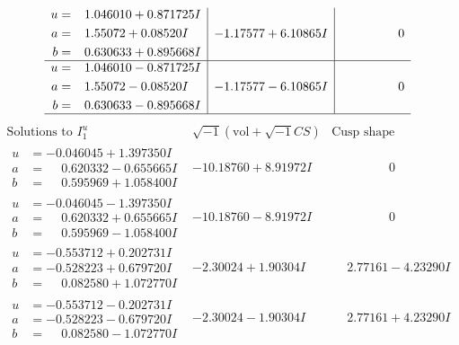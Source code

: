 \documentclass[1p]{elsarticle_modified}
\theoremstyle{definition}
\newcommand{\I}{\sqrt{-1}}
\begin{document}
$$\begin{array}{c|c|c}
\begin{aligned}
u &= \phantom{-}1.046010 + 0.871725 I \\
a &= \phantom{-}1.55072 + 0.08520 I \\
b &= \phantom{-}0.630633 + 0.895668 I\end{aligned}
 & -1.17577 + 6.10865 I & \phantom{-0.000000 } 0 \\ \hline\begin{aligned}
u &= \phantom{-}1.046010 - 0.871725 I \\
a &= \phantom{-}1.55072 - 0.08520 I \\
b &= \phantom{-}0.630633 - 0.895668 I\end{aligned}
 & -1.17577 - 6.10865 I & \phantom{-0.000000 } 0\\
 \hline 
 \end{array}$$\newpage$$\begin{array}{c|c|c}  
\text{Solutions to }I^u_{1}& \I (\text{vol} + \sqrt{-1}CS) & \text{Cusp shape}\\
 \hline 
\begin{aligned}
u &= -0.046045 + 1.397350 I \\
a &= \phantom{-}0.620332 - 0.655665 I \\
b &= \phantom{-}0.595969 + 1.058400 I\end{aligned}
 & -10.18760 + 8.91972 I & \phantom{-0.000000 } 0 \\ \hline\begin{aligned}
u &= -0.046045 - 1.397350 I \\
a &= \phantom{-}0.620332 + 0.655665 I \\
b &= \phantom{-}0.595969 - 1.058400 I\end{aligned}
 & -10.18760 - 8.91972 I & \phantom{-0.000000 } 0 \\ \hline\begin{aligned}
u &= -0.553712 + 0.202731 I \\
a &= -0.528223 + 0.679720 I \\
b &= \phantom{-}0.082580 + 1.072770 I\end{aligned}
 & -2.30024 + 1.90304 I & \phantom{-}2.77161 - 4.23290 I \\ \hline\begin{aligned}
u &= -0.553712 - 0.202731 I \\
a &= -0.528223 - 0.679720 I \\
b &= \phantom{-}0.082580 - 1.072770 I\end{aligned}
 & -2.30024 - 1.90304 I & \phantom{-}2.77161 + 4.23290 I \\ \hline\begin{aligned}

\end{aligned}
\end{array}$$
\end{document}

